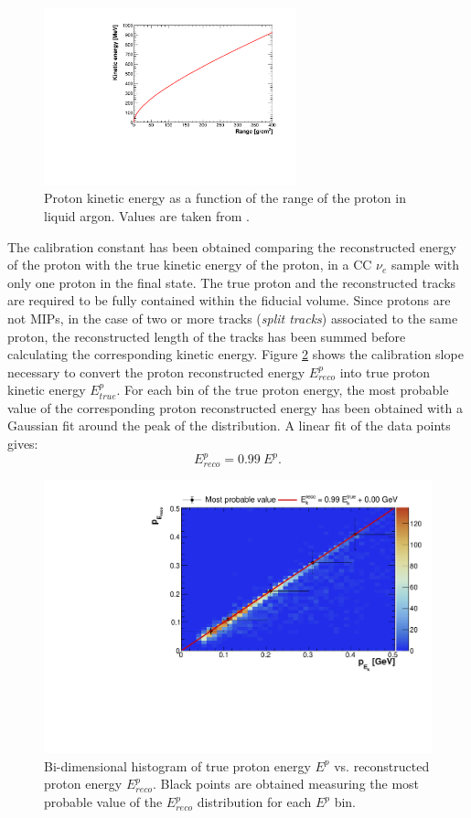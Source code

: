 \begin{figure}[htbp]
\centering
\includegraphics[width=0.65\textwidth]{figures/proton.pdf}
\caption{Proton kinetic energy as a function of the range of the proton in liquid argon. Values are taken from \cite{pstar}.} 
\label{fig:proton}
\end{figure}

The calibration constant has been obtained comparing the reconstructed energy of the proton with the true kinetic energy of the proton, in a CC $\nu_{e}$ sample with only one proton in the final state. The true proton and the reconstructed tracks are required to be fully contained within the fiducial volume. Since protons are not MIPs, in the case of two or more tracks (\emph{split tracks}) associated to the same proton, the reconstructed length of the tracks has been summed before calculating the corresponding kinetic energy.
Figure \ref{fig:pcalib} shows the calibration slope necessary to convert the proton reconstructed energy $E_{reco}^{p}$ into true proton kinetic energy $E_{true}^{p}$. For each bin of the true proton energy, the most probable value of the corresponding proton reconstructed energy has been obtained with a Gaussian fit around the peak of the distribution. A linear fit of the data points gives:
\begin{equation}
E_{reco}^{p} = 0.99~E^{p}.
\end{equation}

\begin{figure}[htbp]
\centering
\includegraphics[width=0.65\columnwidth]{figures/pcalib.pdf}
\caption{Bi-dimensional histogram of true proton energy $E^{p}$ vs. reconstructed proton energy $E_{reco}^{p}$. Black points are obtained measuring the most probable value of the $E_{reco}^{p}$ distribution for each $E^{p}$ bin.}
\label{fig:pcalib}
\end{figure}


